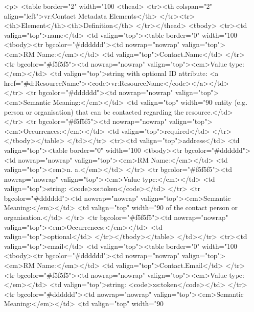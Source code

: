 \documentclass[11pt,a4paper]{ivoa}
\begin{document}
<p>
<table border="2" width="100%
<thead>
  <tr><th colspan="2" align="left">vr:Contact Metadata Elements</th>
  </tr><tr><th>Element</th><th>Definition</th>
</tr></thead>
<tbody>
  <tr><td valign="top">name</td>
      <td valign="top"><table border="0" width="100%
          <tbody><tr bgcolor="#dddddd"><td nowrap="nowrap" valign="top"><em>RM Name:</em></td>
              <td valign="top">Contact.Name</td>
          </tr>
          <tr bgcolor="#f5f5f5"><td nowrap="nowrap" valign="top"><em>Value type:</em></td>
              <td valign="top">string with optional ID attribute: <a href="#d:ResourceName"><code>vr:ResourceName</code></a></td>
          </tr>
          <tr bgcolor="#dddddd"><td nowrap="nowrap" valign="top"><em>Semantic Meaning:</em></td>
              <td valign="top" width="90%
                  entity (e.g. person or organisation) that can be
                  contacted regarding the resource.</td>
          </tr>
          <tr bgcolor="#f5f5f5"><td nowrap="nowrap" valign="top"><em>Occurrences:</em></td>
              <td valign="top">required</td>
          </tr></tbody></table>
      </td></tr>
  <tr><td valign="top">address</td>
      <td valign="top"><table border="0" width="100%
          <tbody><tr bgcolor="#dddddd"><td nowrap="nowrap" valign="top"><em>RM Name:</em></td>
              <td valign="top"><em>n. a.</em></td>
          </tr>
          <tr bgcolor="#f5f5f5"><td nowrap="nowrap" valign="top"><em>Value type:</em></td>
              <td valign="top">string: <code>xs:token</code></td>
          </tr>
          <tr bgcolor="#dddddd"><td nowrap="nowrap" valign="top"><em>Semantic Meaning:</em></td>
              <td valign="top" width="90%
                  of the contact person or organisation.</td>
          </tr>
          <tr bgcolor="#f5f5f5"><td nowrap="nowrap" valign="top"><em>Occurrences:</em></td>
              <td valign="top">optional</td>
          </tr></tbody></table>
      </td></tr>
  <tr><td valign="top">email</td>
      <td valign="top"><table border="0" width="100%
          <tbody><tr bgcolor="#dddddd"><td nowrap="nowrap" valign="top"><em>RM Name:</em></td>
              <td valign="top">Contact.Email</td>
          </tr>
          <tr bgcolor="#f5f5f5"><td nowrap="nowrap" valign="top"><em>Value type:</em></td>
              <td valign="top">string: <code>xs:token</code></td>
          </tr>
          <tr bgcolor="#dddddd"><td nowrap="nowrap" valign="top"><em>Semantic Meaning:</em></td>
              <td valign="top" width="90%
\end{document}
